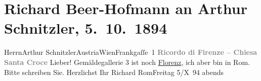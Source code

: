 

         \renewcommand{\erwaehnteOrte}{Orte: Florenz, Frankgasse, IX., Alsergrund, Rom, Santa Croce, Wien, Österreich}
         \renewcommand{\erwaehnteWerke}{}
               \section[Richard Beer-Hofmann an Arthur Schnitzler, 5. 10. 1894]{ Richard Beer-Hofmann an Arthur Schnitzler, 5. 10. 1894}\nopagebreak{}\rehead{ }\begin{ledgroupsized}[t]{13cm}\normalsize\beginnumbering \toendnotes[C]{\smallbreak\pagebreak[2]} 
\pstart{}{\pb}Herrn\pend{}\pstart{}Arthur Schnitzler\pend{}\pstart{}Austria\pend{}\pstart{}Wien\pend{}\pstart{}Frankgaſſe 1\pend{}{\bigskip}\pstart
           \noindent{}\centering{}\textcolor{gray}{\textbf{{\pb}Ricordo di Firenze – Chiesa Santa Croce}}\pend
           \pstart
           Lieber!
               Gemäldegallerie 3 ist noch \uline{Florenz}, ich aber bin in Rom. Bitte schreiben Sie.
               Herzlichst Ihr\pend
           \pstart \spacefill\mbox{Richard}\pend{}\pstart
           RomFreitag 5/X 94{ }abends\pend
           
         
         \endnumbering{}\end{ledgroupsized}  \newcommand{\dateiname}{L00377}\newcommand{\titel}{Richard Beer-Hofmann an Arthur Schnitzler, 5. 10. 1894}\newcommand{\editorInnen}{Martin Anton Müller und Gerd-Hermann Susen}
      